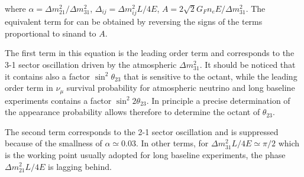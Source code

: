 where $ \alpha = \Delta m^2_{21} / \Delta m^2_{31}$, $\Delta_{ij}= \Delta m^2_{ij} L / 4 E$, $A= 2\sqrt 2 G_F n_e E/ \Delta m^2_{31}$.
The equivalent term for \pappb can be obtained by reversing the signs of the terms proportional to sin\dcp and to $A$. 

The first term in this equation is the leading order term and corresponds to the 3-1 sector oscillation driven by the atmospheric $\Delta m^2_{31}$. It should be noticed that it contains also a factor $\sin^2 \theta_{23}$ that is sensitive to the octant, while the leading order term in $\nu_\mu$ survival probability for atmospheric neutrino and long baseline experiments contains a factor $\sin^2 2 \theta_{23}$. In principle a precise determination of the appearance probability allows therefore to determine the octant of $\theta_{23}$.

The second term corresponds to the 2-1 sector oscillation and is suppressed because of the smallness of $ \alpha \simeq 0.03$. In other terms, for 
$\Delta m^2_{31} L / 4 E \simeq \pi/2$ which is the working point usually adopted for long baseline experiments, the phase $\Delta m^2_{21} L / 4 E$ is lagging behind.

